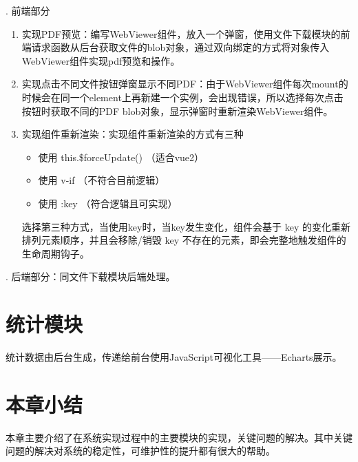 . 前端部分
\begin{enumerate}
  \item 实现PDF预览：编写WebViewer组件，放入一个弹窗，使用文件下载模块的前端请求函数从后台获取文件的blob对象，通过双向绑定的方式将对象传入WebViewer组件实现pdf预览和操作。
  \item 实现点击不同文件按钮弹窗显示不同PDF：由于WebViewer组件每次mount的时候会在同一个element上再新建一个实例，会出现错误，所以选择每次点击按钮时获取不同的PDF blob对象，显示弹窗时重新渲染WebViewer组件。
  \item 实现组件重新渲染：实现组件重新渲染的方式有三种
        \begin{itemize}
          \item 使用 this.\$forceUpdate() （适合vue2）
          \item 使用 v-if （不符合目前逻辑）
          \item 使用 :key （符合逻辑且可实现）
        \end{itemize}
        选择第三种方式，当使用key时，当key发生变化，组件会基于 key 的变化重新排列元素顺序，并且会移除/销毁 key 不存在的元素，即会完整地触发组件的生命周期钩子。
\end{enumerate}
. 后端部分：同文件下载模块后端处理。


\section{统计模块}

统计数据由后台生成，传递给前台使用JavaScript可视化工具——Echarts展示。


\section{本章小结}

本章主要介绍了在系统实现过程中的主要模块的实现，关键问题的解决。其中关键问题的解决对系统的稳定性，可维护性的提升都有很大的帮助。